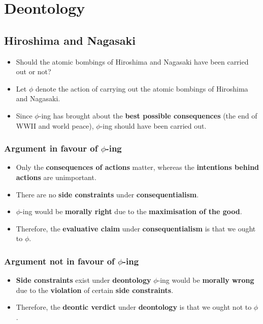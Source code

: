 \documentclass[11pt]{article}
\begin{document}
 \newpage
\section{Deontology}
\label{sec:org7c32ff7}

\subsection{Hiroshima and Nagasaki}
\label{sec:org6075e12}
\begin{itemize}
\item Should the atomic bombings of Hiroshima and Nagasaki have been carried out or not?
\item Let \(\phi\) denote the action of carrying out the atomic bombings of Hiroshima and Nagasaki.
\item Since \(\phi\)-ing has brought about the \textbf{best possible consequences} (the end of WWII and world peace), \(\phi\)-ing should have been carried out.
\end{itemize}
\subsubsection{Argument in favour of \(\phi\)-ing}
\label{sec:orgb1194ff}
\begin{itemize}
\item Only the \textbf{consequences of actions} matter, whereas the \textbf{intentions behind actions} are unimportant.
\item There are no \textbf{side constraints} under \textbf{consequentialism}.
\item \(\phi\)-ing would be \textbf{morally right} due to the \textbf{maximisation of the good}.
\item Therefore, the \textbf{evaluative claim} under \textbf{consequentialism} is that we ought to \(\phi\).
\end{itemize}
\subsubsection{Argument not in favour of \(\phi\)-ing}
\label{sec:orga4a2df5}
\begin{itemize}
\item \textbf{Side constraints} exist under \textbf{deontology} \(\phi\)-ing would be \textbf{morally wrong} due to the \textbf{violation} of certain \textbf{side constraints}.
\item Therefore, the \textbf{deontic verdict} under \textbf{deontology} is that we ought not to \(\phi\).
\end{itemize}
\end{document}
